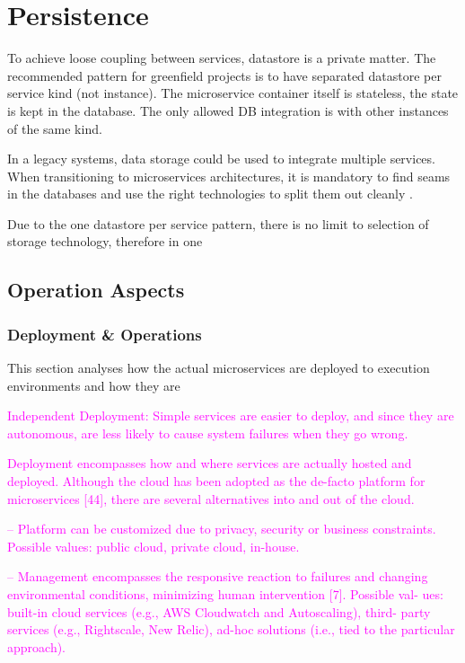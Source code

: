 \documentclass[thesis=M,english,hidelinks]{FITthesis}[2012/10/20]
\begin{document}
% 
% 
\section{Persistence}
\label{sec:persistence}

To achieve loose coupling between services, datastore is a private matter. The recommended pattern for greenfield projects is to have separated datastore per service kind (not instance). The microservice container itself is stateless, the state is kept in the database. The only allowed \acrshort{DB} integration is with other instances of the same kind.

In a legacy systems, data storage could be used to integrate multiple services. When transitioning to microservices architectures, it is mandatory to find seams in the databases and use the right technologies to split them out cleanly \cite{ms-building-ms}.

Due to the one datastore per service pattern, there is no limit to selection of storage technology, therefore in one 

\subsection{Operation Aspects}
\subsubsection{Deployment \& Operations}
\label{sec:operations}
This section analyses how the actual microservices are deployed to execution environments and how they are 


\textcolor{magenta}{Independent Deployment: Simple services are easier to deploy, and since they are autonomous, are less likely to cause system failures when they go wrong.}

\textcolor{magenta}{Deployment encompasses how and where services are actually hosted and deployed. Although the cloud has been adopted as the de-facto platform for microservices [44], there are several alternatives into and out of the cloud.}

\textcolor{magenta}{– Platform can be customized due to privacy, security or business constraints. Possible values: public cloud, private cloud, in-house.}

\textcolor{magenta}{– Management encompasses the responsive reaction to failures and changing environmental conditions, minimizing human intervention [7]. Possible val- ues: built-in cloud services (e.g., AWS Cloudwatch and Autoscaling), third- party services (e.g., Rightscale, New Relic), ad-hoc solutions (i.e., tied to the particular approach).}
\end{document}
